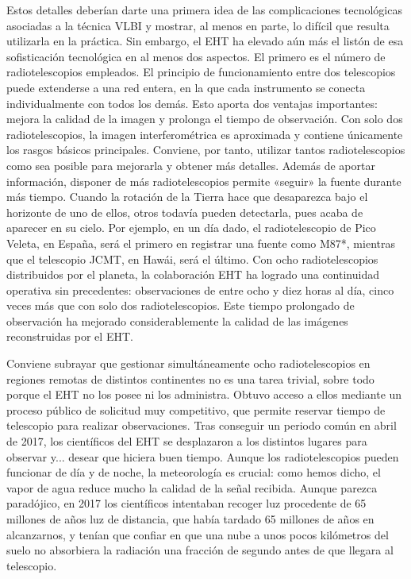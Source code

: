 Estos detalles deberían darte una primera idea de las complicaciones tecnológicas asociadas a la técnica VLBI y mostrar, al menos en parte, lo difícil que resulta utilizarla en la práctica. Sin embargo, el EHT ha elevado aún más el listón de esa sofisticación tecnológica en al menos dos aspectos. El primero es el número de radiotelescopios empleados. El principio de funcionamiento entre dos telescopios puede extenderse a una red entera, en la que cada instrumento se conecta individualmente con todos los demás. Esto aporta dos ventajas importantes: mejora la calidad de la imagen y prolonga el tiempo de observación. Con solo dos radiotelescopios, la imagen interferométrica es aproximada y contiene únicamente los rasgos básicos principales. Conviene, por tanto, utilizar tantos radiotelescopios como sea posible para mejorarla y obtener más detalles. Además de aportar información, disponer de más radiotelescopios permite «seguir» la fuente durante más tiempo. Cuando la rotación de la Tierra hace que desaparezca bajo el horizonte de uno de ellos, otros todavía pueden detectarla, pues acaba de aparecer en su cielo. Por ejemplo, en un día dado, el radiotelescopio de Pico Veleta, en España, será el primero en registrar una fuente como M87*, mientras que el telescopio JCMT, en Hawái, será el último. Con ocho radiotelescopios distribuidos por el planeta, la colaboración EHT ha logrado una continuidad operativa sin precedentes: observaciones de entre ocho y diez horas al día, cinco veces más que con solo dos radiotelescopios. Este tiempo prolongado de observación ha mejorado considerablemente la calidad de las imágenes reconstruidas por el EHT.

Conviene subrayar que gestionar simultáneamente ocho radiotelescopios en regiones remotas de distintos continentes no es una tarea trivial, sobre todo porque el EHT no los posee ni los administra. Obtuvo acceso a ellos mediante un proceso público de solicitud muy competitivo, que permite reservar tiempo de telescopio para realizar observaciones. Tras conseguir un periodo común en abril de 2017, los científicos del EHT se desplazaron a los distintos lugares para observar y... desear que hiciera buen tiempo. Aunque los radiotelescopios pueden funcionar de día y de noche, la meteorología es crucial: como hemos dicho, el vapor de agua reduce mucho la calidad de la señal recibida. Aunque parezca paradójico, en 2017 los científicos intentaban recoger luz procedente de 65 millones de años luz de distancia, que había tardado 65 millones de años en alcanzarnos, y tenían que confiar en que una nube a unos pocos kilómetros del suelo no absorbiera la radiación una fracción de segundo antes de que llegara al telescopio.

